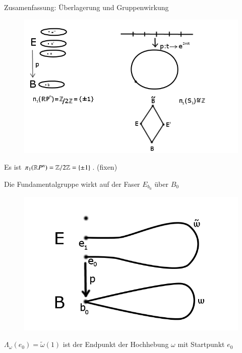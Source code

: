 \documentclass[a4paper,10pt]{scrartcl}
\begin{document}
\begin{seg}{Zusamenfassung: Überlagerung und Gruppenwirkung}
\begin{figure}[H]
\centering
 \includegraphics[scale=0.5]{fig78.png}
 \caption{}
\end{figure}
Es ist $\pi_1(\mathbb{R} P^n)=\mathbb{Z}/2\mathbb{Z}=\{\pm 1\}$. (fixen)

Die Fundamentalgruppe wirkt auf der Faser $E_{b_0}$ über $B_0$\\
\begin{figure}[H]
\centering
 \includegraphics[scale=0.3]{fig79.png}
 \caption{}
\end{figure}


$\Lambda_\omega(e_0)=\tilde \omega(1)$ ist der Endpunkt der Hochhebung $\omega$ mit Startpunkt $e_0$


\end{seg}
\end{document}
